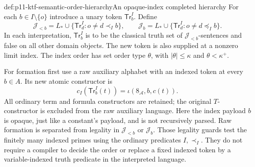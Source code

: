 \begin{hbdefinition}{def:p11-ktf-semantic-order-hierarchy}{An opaque-index completed hierarchy}
For each \(b\in I\setminus\{o\}\) introduce a unary token
\(\mathsf{Tr}^{I}_b\). Define
\[
 \mathcal J_{<b}=L_*\cup
       \{\mathsf{Tr}^{I}_d:o\ne d\prec_I b\},\qquad
 \mathcal J_b=L_*\cup
       \{\mathsf{Tr}^{I}_d:o\ne d\preceq_I b\}.
\]
In each interpretation, \(\mathsf{Tr}^{I}_b\) is to be the
classical truth set of \(\mathcal J_{<b}\)-sentences and false
on all other domain objects. The new token is also supplied at a
nonzero limit index. The index order has set order type
\(\theta\), with \(\lvert\theta\rvert\leq\kappa\) and
\(\theta<\kappa^+\).

For formation first use a raw auxiliary alphabet with an indexed token
at every \(b\in A\). Its new atomic constructor is
\[
 c_I(\mathsf{Tr}^{I}_b(t))=
       \iota(8_{\mathcal A},b,c(t)).
\]
All ordinary term and formula constructors are retained; the original
\(T\)-constructor is excluded from the raw auxiliary language.
Here the index payload \(b\) is opaque, just like a constant's
payload, and is not recursively parsed. Raw formation is separated
from legality in \(\mathcal J_{<b}\) or \(\mathcal J_b\).
Those legality guards test the finitely many indexed primes using
the ordinary predicates \(I,\prec_I\). They do not require a
compiler to decide the order or replace a fixed indexed token by a
variable-indexed truth predicate in the interpreted language.
\end{hbdefinition}


